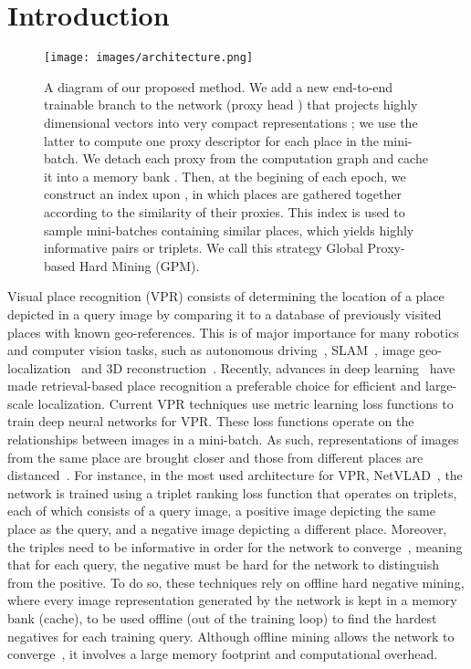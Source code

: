 \documentclass{bmvc2k}
\begin{document}
\section{Introduction}
\label{sec:intro}
\begin{figure}[th]
\centering
  \texttt{[image: images/architecture.png]}
  \vspace{0.5pt}
  \caption{A diagram of our proposed method. We add a new end-to-end trainable branch to the network (proxy head ) that projects highly dimensional vectors  into very compact representations  ; we use the latter to compute one proxy descriptor  for each place in the mini-batch. We detach each proxy from the computation graph and cache it into a memory bank . Then, at the begining of each epoch, we construct an index upon , in which places are gathered together according to the similarity of their proxies. This index is used to sample mini-batches containing similar places, which yields highly informative pairs or triplets. We call this strategy Global Proxy-based Hard Mining (GPM).}
\label{fig:arch}
\end{figure}
Visual place recognition (VPR) consists of determining the location of a place depicted in a query image by comparing it to a database of previously visited places with known geo-references. This is of major importance for many robotics and computer vision tasks, such as autonomous driving~\cite{chowdhary2013gps, maddern20171}, SLAM~\cite{milford2012seqslam, engel2014lsd}, image geo-localization~\cite{baik2020domain, hausler2021patch, wang2022transvpr} and 3D reconstruction~\cite{cieslewski2016point, sattler2017large}.
Recently, advances in deep learning~\cite{menghani2021efficient} have made retrieval-based place recognition a preferable choice for efficient and large-scale localization. Current VPR techniques \cite{arandjelovic2016netvlad, liu2019stochastic, warburg2020mapillary, thoma2020soft, zhu2020regional, hausler2021patch, wang2022transvpr} use metric learning loss functions to train deep neural networks for VPR. These loss functions operate on the relationships between images in a mini-batch. As such, representations of images from the same place are brought closer and those from different places are distanced~\cite{musgrave2020metric}. For instance, in the most used architecture for VPR, NetVLAD~\cite{arandjelovic2016netvlad, liu2019stochastic, warburg2020mapillary, hausler2021patch, wang2022transvpr}, the network is trained using a triplet ranking loss function that operates on triplets, each of which consists of a query image, a positive image depicting the same place as the query, and a negative image depicting a different place. Moreover, the triples need to be informative in order for the network to converge~\cite{hermans2017defense}, meaning that for each query, the negative must be hard for the network to distinguish from the positive. To do so, these techniques rely on offline hard negative mining, where every image representation generated by the network is kept in a memory bank (cache), to be used offline (out of the training loop) to find the hardest negatives for each training query. Although offline mining allows the network to converge~\cite{warburg2020mapillary}, it involves a large memory footprint and computational overhead.
\end{document}
